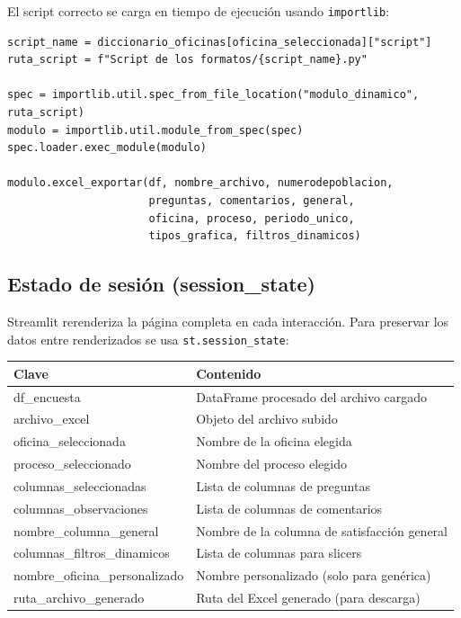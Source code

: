 \documentclass[12pt, letterpaper]{article}
\begin{document}
El script correcto se carga en tiempo de ejecución usando \texttt{importlib}:

\begin{lstlisting}[caption={Importación dinámica del módulo de oficina}]
script_name = diccionario_oficinas[oficina_seleccionada]["script"]
ruta_script = f"Script de los formatos/{script_name}.py"

spec = importlib.util.spec_from_file_location("modulo_dinamico", ruta_script)
modulo = importlib.util.module_from_spec(spec)
spec.loader.exec_module(modulo)

modulo.excel_exportar(df, nombre_archivo, numerodepoblacion,
                      preguntas, comentarios, general,
                      oficina, proceso, periodo_unico,
                      tipos_grafica, filtros_dinamicos)
\end{lstlisting}

\subsection{Estado de sesión (session\_state)}

Streamlit rerenderiza la página completa en cada interacción. Para preservar los datos entre renderizados se usa \texttt{st.session\_state}:

\begin{center}
\begin{tabular}{>{\ttfamily}l l}
\toprule
\textbf{Clave} & \textbf{Contenido} \\
\midrule
df\_encuesta & DataFrame procesado del archivo cargado \\
archivo\_excel & Objeto del archivo subido \\
oficina\_seleccionada & Nombre de la oficina elegida \\
proceso\_seleccionado & Nombre del proceso elegido \\
columnas\_seleccionadas & Lista de columnas de preguntas \\
columnas\_observaciones & Lista de columnas de comentarios \\
nombre\_columna\_general & Nombre de la columna de satisfacción general \\
columnas\_filtros\_dinamicos & Lista de columnas para slicers \\
nombre\_oficina\_personalizado & Nombre personalizado (solo para genérica) \\
ruta\_archivo\_generado & Ruta del Excel generado (para descarga) \\
\bottomrule
\end{tabular}
\end{center}
\end{document}
